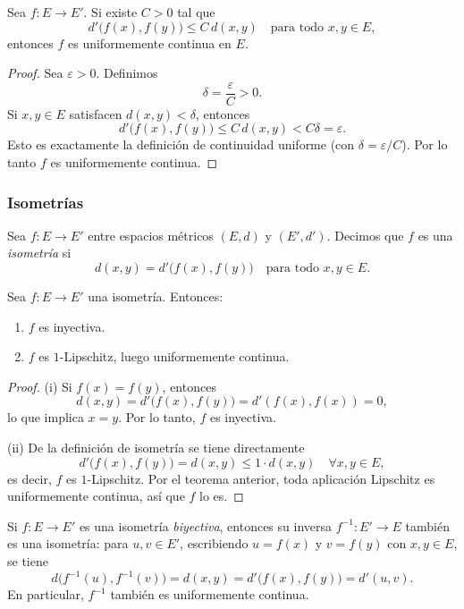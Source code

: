 \begin{teo}
Sea $f : E \to E'$. Si existe $C>0$ tal que
\[
d'\bigl(f(x),f(y)\bigr) \le C\, d(x,y)
\quad \text{para todo } x,y \in E,
\]
entonces $f$ es uniformemente continua en $E$.
\end{teo}

\begin{proof}
Sea $\varepsilon>0$. Definimos
\[
\delta = \frac{\varepsilon}{C} > 0.
\]
Si $x,y \in E$ satisfacen $d(x,y) < \delta$, entonces
\[
d'\bigl(f(x),f(y)\bigr) \le C\, d(x,y) < C \delta = \varepsilon.
\]
Esto es exactamente la definición de continuidad uniforme
(con $\delta = \varepsilon/C$). Por lo tanto $f$ es uniformemente
continua.
\end{proof}

\subsubsection{Isometrías}

\begin{defi}
Sea $f : E \to E'$ entre espacios métricos $(E,d)$ y $(E',d')$.
Decimos que $f$ es una \emph{isometría} si
\[
d(x,y) = d'\bigl(f(x),f(y)\bigr)
\quad \text{para todo } x,y \in E.
\]
\end{defi}

\begin{prop}
Sea $f : E \to E'$ una isometría. Entonces:
\begin{enumerate}[label=(\roman*)]
    \item $f$ es inyectiva.
    \item $f$ es $1$-Lipschitz, luego uniformemente continua.
\end{enumerate}
\end{prop}

\begin{proof}
(i) Si $f(x) = f(y)$, entonces
\[
d(x,y) = d'\bigl(f(x),f(y)\bigr) = d'(f(x),f(x)) = 0,
\]
lo que implica $x=y$. Por lo tanto, $f$ es inyectiva.

(ii) De la definición de isometría se tiene directamente
\[
d'\bigl(f(x),f(y)\bigr) = d(x,y) \le 1 \cdot d(x,y)
\quad \forall x,y \in E,
\]
es decir, $f$ es $1$-Lipschitz. Por el teorema anterior, toda
aplicación Lipschitz es uniformemente continua, así que $f$ lo es.
\end{proof}

\begin{obs}
Si $f : E \to E'$ es una isometría \emph{biyectiva}, entonces su inversa
$f^{-1} : E' \to E$ también es una isometría: para $u,v \in E'$,
escribiendo $u = f(x)$ y $v = f(y)$ con $x,y \in E$, se tiene
\[
d\bigl(f^{-1}(u),f^{-1}(v)\bigr) = d(x,y) = d'\bigl(f(x),f(y)\bigr)
= d'(u,v).
\]
En particular, $f^{-1}$ también es uniformemente continua.
\end{obs}

